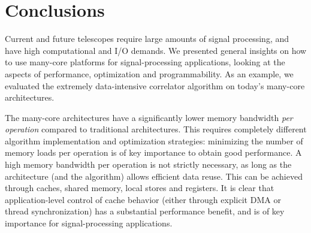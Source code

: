 \documentclass{article}
\newcommand{\longversion}[1]{}
\begin{document}
\longversion{
\section{Applying the techniques: a case study with the Intel Larrabee}

Intel recently disclosed some details about the upcoming Larrabee processor,
a fully programmable GPU based on the well-known x86 instruction set.
Although performance details are unknown, it is interesting to compare the
Larrabee to the aforementioned architectures, and to see how a correlator
should be implemented to obtain optimal performance.

The processing power comes from Larrabee's relatively long vector size:
a vector holds 16~elements, where the other architectures have vectors lengths
of at most~4.
The long vector size forces us to reconsider our parallelization strategy.
There are several options to perform 16~simultaneous FMAs.
One option is to operate on 16~samples with consecutive time stamps.
A minor drawback is that the data must be ``horizontally'' added to integrate,
but this can be done outside the main loop.
Another option is to operate on samples from 16~consecutive frequencies.

Another option is to correlate samples from different receivers as illustrated
by Figure~\ref{fig-correlation}.
This method minimizes memory loads, but requires additional shuffling of data.
Unfortunately, the most efficient method can only be determined empirically,
when the hardware is available.
} %


\section{Conclusions}
\label{conclusions}
Current and future telescopes require large amounts of signal processing, 
and have high computational and I/O demands.
We presented general insights on how to use many-core
platforms for signal-processing applications, looking at the aspects of
performance, optimization and programmability.
As an example, we evaluated the extremely
data-intensive correlator algorithm on today's many-core
architectures. 

The many-core architectures have a significantly lower memory
bandwidth \emph{per operation} compared to traditional architectures.
This requires completely different algorithm implementation and optimization strategies:
minimizing the number of memory loads per operation is of key
importance to obtain good performance.  A high memory bandwidth per
operation is not strictly necessary, as long as the architecture (and the
algorithm) allows efficient data reuse.  This can be achieved through
caches, shared memory, local stores and registers.  It is clear that
application-level control of cache behavior (either through explicit
DMA or thread synchronization) has a substantial performance benefit,
and is of key importance for signal-processing
applications.
\end{document}
